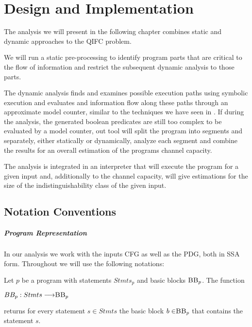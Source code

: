 \chapter{Design and Implementation}\label{sec:impl}

The analysis we will present in the following chapter combines static and dynamic approaches to the QIFC problem. 

We will run a static pre-processing to identify program parts that are critical to the flow of information and restrict the subsequent dynamic analysis to those parts.

The dynamic analysis finds and examines possible execution paths using symbolic execution and evaluates and information flow along these paths through an approximate model counter, similar to the techniques we have seen in \cite{klebanov13, biondi18, chu19}.
If during the analysis, the generated boolean predicates are still too complex to be evaluated by a model counter, out tool will split the program into segments and separately, either statically or dynamically, analyze each segment and combine the results for an overall estimation of the programs channel capacity.

The analysis is integrated in an interpreter that will execute the program for a given input and, additionally to the channel capacity, will give estimations for the size of the indistinguishability class of the given input.


\section{Notation Conventions}

\paragraph{Program Representation}
In our analysis we work with the inputs CFG as well as the PDG, both in SSA form. Throughout we will use the following notations:

\begin{definition}
    Let $p$ be a program with statements $Stmts_p$ and basic blocks $\mbb_p$. The function
    \begin{center}
        $BB_p: Stmts \longrightarrow \mbb_p$
    \end{center}
    returns for every statement $s \in Stmts$ the basic block $b \in \mbb_p$ that contains the statement $s$.
\end{definition}

